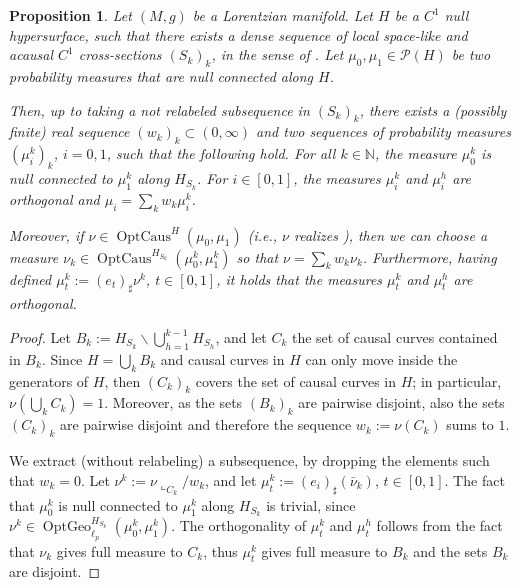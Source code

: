 \documentclass[12pt,a4paper]{amsart}
\theoremstyle{plain}
\newtheorem{proposition}[lemma]{Proposition}
\theoremstyle{definition}
\numberwithin{equation}{section}
\newcommand{\N}{\mathbb{N}}
\DeclareMathOperator{\OptCaus}{OptCaus}
\DeclareMathOperator{\OptGeo}{OptGeo}
\newcommand{\Prob}{\mathcal P}
\begin{document}
\begin{proposition}
  \label{P:decomposition}
Let $(M,g)$ be a Lorentzian manifold.
  Let $H$ be a $C^1$ null hypersurface, such that there exists   a
  dense sequence of local space-like and acausal $C^1$ cross-sections $(S_k)_k$, in the sense of .
  Let $\mu_0,\mu_1\in \Prob(H)$ be two probability measures that are
  null connected along $H$.

  Then, up to taking a not relabeled subsequence in $(S_k)_k$, there
  exists a (possibly finite) real sequence $(w_k)_k\subset (0,\infty)$ and two sequences
  of probability measures $(\mu_i^k)_k$, $i=0,1$, such that the
  following hold.
  For all $k\in\N$, the measure $\mu_0^k$ is null connected to $\mu_1^k$
  along $H_{S_k}$.
  For $i\in[0,1]$, the measures $\mu_i^k$ and $\mu_i^h$ are orthogonal and
  $\mu_i=\sum_k w_k \mu_i^k$.

  Moreover, if  $\nu\in\OptCaus^{H}(\mu_0,\mu_1)$ (i.e., $\nu$
  realizes ), then we can choose a measure
 $\nu_k\in\OptCaus^{H_{S_k}}(\mu_{0}^{k},\mu_{1}^{k})$ so that $\nu=\sum_k w_k \nu_k$.
  Furthermore, having defined $\mu_t^k:=(e_t)_{\sharp} \nu^k$,
  $t\in[0,1]$, it holds that the measures $\mu_t^k$ and $\mu_t^h$ are
  orthogonal.
\end{proposition}

\begin{proof}
  Let $B_k:=H_{S_k}\backslash \bigcup_{h=1}^{k-1} H_{S_h}$, and let
  $C_k$ the set of causal curves contained in $B_k$.
  Since $H=\bigcup_k B_k$ and causal curves in $H$ can only move inside the generators of $H$, 
  then $(C_k)_{k}$ covers the set of causal
  curves in $H$; in particular, $\nu(\bigcup_k C_k)=1$.
  Moreover, as the sets $(B_k)_k$ are pairwise disjoint,  also the sets
  $(C_k)_k$ are pairwise disjoint and therefore the sequence
  $w_k:= \nu(C_k)$ sums to $1$.

  We extract (without relabeling) a subsequence, by dropping the
  elements such that $w_k=0$.
  Let $\nu^k:=\nu\llcorner_{C_k}/w_k$, and let
  $\mu_t^k:=(e_i)_{\sharp}(\bar\nu_k)$, $t\in[0,1]$.
  The fact that $\mu_0^k$ is null connected to $\mu_1^k$ along $H_{S_k}$
  is trivial, since
  $\nu^k\in\OptGeo_{\ell_p}^{H_{S_k}}(\mu_0^k,\mu_1^k)$.
  The orthogonality of $\mu_t^k$ and $\mu_t^h$ follows from
  the fact that $\nu_k$ gives full measure to $C_k$, thus $\mu_t^k$
  gives full measure to $B_k$ and the sets $B_k$ are disjoint.
\end{proof}
\end{document}
